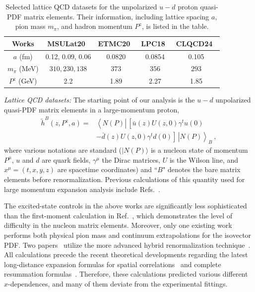 \documentclass[prl,aps,twocolumn,preprintnumbers, showpacs, nofootinbib,superscriptaddress,notitlepage]{revtex4-1}
\begin{document}
\begin{table}[htbp]
    \centering
    \begin{tabular}{|c|c|c|c|c|}
      \hline
      Works & MSULat20~\cite{Lin:2020fsj} & ETMC20~\cite{Alexandrou:2020qtt} & LPC18~\cite{LatticeParton:2018gjr} &  CLQCD24~\cite{Chen:2024rgi} \\
      \hline
      $a$ (fm) & 0.12, 0.09, 0.06 &  0.0820 & 0.0854 & 0.105 \\
      \hline
      $m_{\pi}$ (MeV) & $310, 230, 138$ & $373$ & $356$ & $293$ \\
      \hline
      $P^z$ (GeV) & 2.2 & 1.89 & 2.27 & 1.85 \\ 
      \hline
    \end{tabular}
    \caption{Selected lattice QCD datasets for the unpolarized $u-d$ proton quasi-PDF matrix elements. Their information, including lattice spacing $a$, pion mass $m_{\pi}$, and hadron momentum $P^z$, is listed in the table. }
    \label{tab:setlatdat}
\end{table}

\textit{Lattice QCD datasets:}\quad 
The starting point of our analysis is the $u-d$ unpolarized quasi-PDF matrix elements in a large-momentum proton,
\begin{align}\label{eq:BareM}
\tilde{h}^{B}(z,P^z,a) = 
&\left\langle N(P) \left| \, \left[ \bar{u}(z) U(z,0) \gamma^t u(0) \right. \right. \right. \nonumber\\ 
&\left. \left. \left. - \bar{d}(z) U(z,0) \gamma^t d(0) \right] \, \right| N(P) \right\rangle_B \ ,
\end{align}
where various notations are standard ($|N(P)\rangle$ is a nucleon state of momentum $P^\mu$,  $u$ and $d$ are quark fields, $\gamma^\mu$ the Dirac matrices, $U$ is the Wilson line, and $x^\mu=(t,x,y,z)$ are spacetime coordinates) and ``$B$" denotes the bare matrix elements before renormalization. Previous calculations of this quantity used for large momentum expansion analysis include Refs.~\cite{Lin:2014zya,Alexandrou:2015rja,Chen:2016utp,Alexandrou:2016jqi,Alexandrou:2018pbm,Chen:2018xof,LatticeParton:2018gjr,Alexandrou:2019lfo,Fan:2020nzz,Alexandrou:2020qtt,Lin:2020fsj,Gao:2022uhg,Chen:2024rgi}. 

The excited-state controls in the above works are significantly less sophisticated than the first-moment calculation in Ref.~\cite{Mondal:2020ela}, which demonstrates the level of difficulty in the nucleon matrix elements.  Moreover, only one existing work~\cite{Lin:2020fsj} performs both physical pion mass and continuum extrapolations for the isovector PDF. Two papers~\cite{Gao:2022uhg,Chen:2024rgi} utilize the more advanced hybrid renormalization technique~\cite{Ji:2020brr}. All calculations precede the recent theoretical developments regarding the latest long-distance expansion formulas for spatial correlations~\cite{Ji:2026vir} and complete resummation formulas~\cite{Su:2022fiu,Zhang:2023bxs,Ji:2023pba,Liu:2023onm,Ji:2024hit}. Therefore, these calculations predicted various different $x$-dependences, and many of them deviate from the experimental fittings.
\end{document}
